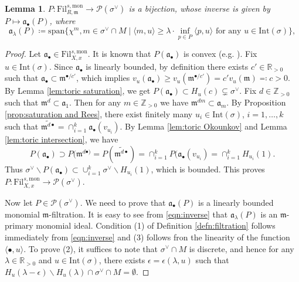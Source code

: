 \documentclass[11pt, leqno]{amsart}%
\theoremstyle{plain}
\newtheorem{lemma}[theorem]{Lemma}
\theoremstyle{definition}
\theoremstyle{remark}
\newcommand{\cP}{\mathcal{P}}
\newcommand{\bR}{\mathbb{R}}
\newcommand{\bZ}{\mathbb{Z}}
\newcommand{\fa}{\mathfrak{a}}
\newcommand{\fm}{\mathfrak{m}}
\newcommand{\Int}{\mathrm{Int}}
\newcommand{\Fil}{\mathrm{Fil}}
\numberwithin{equation}{section}
\begin{document}
\begin{lemma}\label{lem:toric bijection betweem Fil and Okounkov}
    $P:\Fil^{s,\mathrm{mon}}_{R,\fm}\to \cP(\sigma^\vee)$ is a bijection, whose inverse is given by $P\mapsto \fa_\bullet(P)$, where
    \begin{equation}\label{eqn:inverse}
        \fa_\lambda(P)\coloneqq \mathrm{span} \{\chi^m, m\in\sigma^\vee\cap M\mid \langle m,u\rangle \ge \lambda\cdot \inf_{p\in P}\langle p,u\rangle \text{ for any } u\in\Int(\sigma)\},
    \end{equation}
\end{lemma}

\begin{proof}
    Let $\fa_\bullet\in\Fil^{s,\mathrm{mon}}_{X,x}$. It is known that $P(\fa_\bullet)$ is convex (e.g. \cite{KK14}). Fix $u\in\Int(\sigma)$.  Since $\fa_\bullet$ is linearly bounded, by definition there exists $c'\in\bR_{>0}$ such that $\fa_\bullet\subset \fm^{\bullet/c'}$, which implies $v_u(\fa_\bullet)\ge v_u(\fm^{\bullet/c'})=c'v_u(\fm)\eqqcolon c>0$. By Lemma \ref{lem:toric saturation}, we get $P(\fa_\bullet)\subset H_u(c)\subsetneq \sigma^\vee$. Fix $d\in\bZ_{>0}$ such that $\fm^d\subset\fa_1$. Then for any $m\in\bZ_{>0}$ we have $\fm^{dm}\subset\fa_m$. By Proposition \ref{prop:saturation and Rees}, there exist finitely many $u_i\in\Int(\sigma)$, $i=1,\ldots,k$ such that $\widetilde{\fm^{d\bullet}}=\cap_{i=1}^k \fa_\bullet(v_{u_i})$. By Lemma \ref{lem:toric Okounkov} and Lemma \ref{lem:toric intersection}, we have 
    \[
          P(\fa_\bullet)\supset P(\fm^{d\bullet)}= P(\widetilde{\fm^{d\bullet}})=\cap_{i=1}^k P(\fa_\bullet(v_{u_i})=\cap_{i=1}^k H_{u_i}(1).
    \]
    Thus $\sigma^\vee\backslash P(\fa_\bullet)\subset \cup_{i=1}^k \sigma^\vee\backslash H_{u_i}(1)$, which is bounded. This proves $P:\Fil^{s,\mathrm{mon}}_{X,x}\to \cP(\sigma^\vee)$.

    Now let $P\in\cP(\sigma^\vee)$. We need to prove that $\fa_\bullet(P)$ is a linearly bounded monomial $\fm$-filtration. It is easy to see from \eqref{eqn:inverse} that $\fa_\lambda(P)$ is an $\fm$-primary monomial ideal. Condition (1) of Definition \ref{defn:filtration} follows immediately from \eqref{eqn:inverse} and (3) follows fron the linearity of the function $\langle \bullet,u \rangle$. To prove (2), it suffices to note that $\sigma^\vee\cap M$ is discrete, and hence for any $\lambda\in\bR_{>0}$ and $u\in\Int(\sigma)$, there exists $\epsilon=\epsilon(\lambda,u)$ such that $H_u(\lambda-\epsilon)\backslash H_u(\lambda)\cap \sigma^\vee\cap M=\emptyset$. 


\end{proof}
\end{document}
